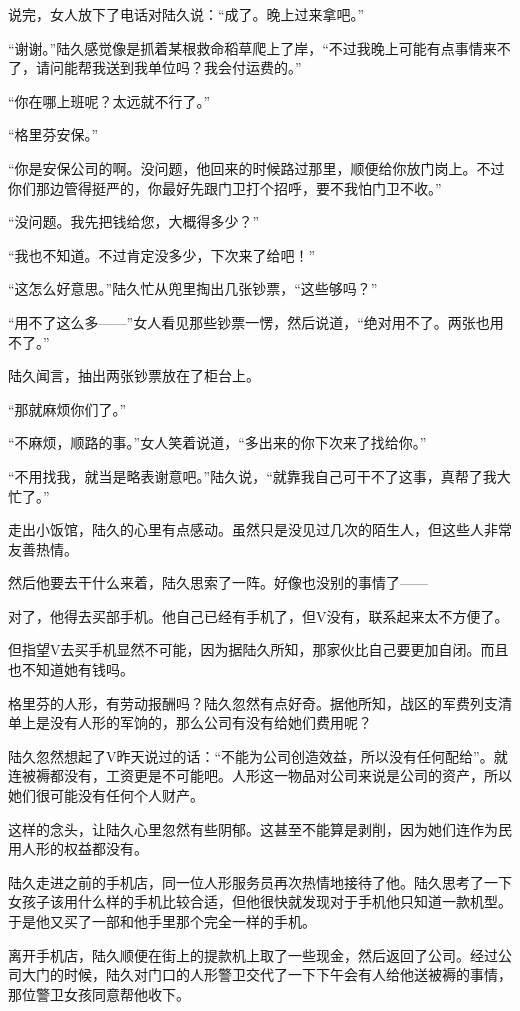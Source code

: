 说完，女人放下了电话对陆久说：“成了。晚上过来拿吧。”

“谢谢。”陆久感觉像是抓着某根救命稻草爬上了岸，“不过我晚上可能有点事情来不了，请问能帮我送到我单位吗？我会付运费的。”

“你在哪上班呢？太远就不行了。”

“格里芬安保。”

“你是安保公司的啊。没问题，他回来的时候路过那里，顺便给你放门岗上。不过你们那边管得挺严的，你最好先跟门卫打个招呼，要不我怕门卫不收。”

“没问题。我先把钱给您，大概得多少？”

“我也不知道。不过肯定没多少，下次来了给吧！”

“这怎么好意思。”陆久忙从兜里掏出几张钞票，“这些够吗？”

“用不了这么多——”女人看见那些钞票一愣，然后说道，“绝对用不了。两张也用不了。”

陆久闻言，抽出两张钞票放在了柜台上。

“那就麻烦你们了。”

“不麻烦，顺路的事。”女人笑着说道，“多出来的你下次来了找给你。”

“不用找我，就当是略表谢意吧。”陆久说，“就靠我自己可干不了这事，真帮了我大忙了。”

走出小饭馆，陆久的心里有点感动。虽然只是没见过几次的陌生人，但这些人非常友善热情。

然后他要去干什么来着，陆久思索了一阵。好像也没别的事情了——

对了，他得去买部手机。他自己已经有手机了，但V没有，联系起来太不方便了。

但指望V去买手机显然不可能，因为据陆久所知，那家伙比自己要更加自闭。而且也不知道她有钱吗。

格里芬的人形，有劳动报酬吗？陆久忽然有点好奇。据他所知，战区的军费列支清单上是没有人形的军饷的，那么公司有没有给她们费用呢？

陆久忽然想起了V昨天说过的话：“不能为公司创造效益，所以没有任何配给”。就连被褥都没有，工资更是不可能吧。人形这一物品对公司来说是公司的资产，所以她们很可能没有任何个人财产。

这样的念头，让陆久心里忽然有些阴郁。这甚至不能算是剥削，因为她们连作为民用人形的权益都没有。

陆久走进之前的手机店，同一位人形服务员再次热情地接待了他。陆久思考了一下女孩子该用什么样的手机比较合适，但他很快就发现对于手机他只知道一款机型。于是他又买了一部和他手里那个完全一样的手机。

离开手机店，陆久顺便在街上的提款机上取了一些现金，然后返回了公司。经过公司大门的时候，陆久对门口的人形警卫交代了一下下午会有人给他送被褥的事情，那位警卫女孩同意帮他收下。

